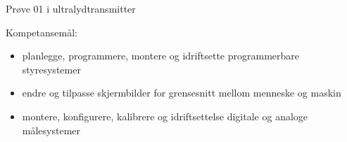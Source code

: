 
\Huge Prøve 01  i ultralydtransmitter 
\normalsize

\vskip 5pt 
Kompetansemål:
\begin{itemize}[noitemsep]
\item planlegge, programmere, montere og idriftsette programmerbare styresystemer
\item endre og tilpasse skjermbilder for grensesnitt mellom menneske og maskin
\item montere, konfigurere, kalibrere og idriftsettelse digitale og analoge målesystemer
\end{itemize}

